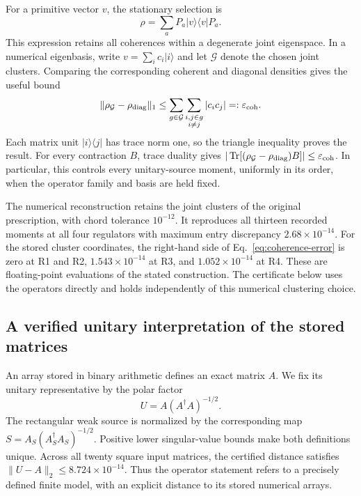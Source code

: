 For a primitive vector $v$, the stationary selection is
\[
\rho=\sum_aP_a|v\rangle\langle v|P_a.
\]
This expression retains all coherences within a degenerate joint eigenspace. In a numerical eigenbasis, write $v=\sum_i c_i|i\rangle$ and let $\mathcal G$ denote the chosen joint clusters. Comparing the corresponding coherent and diagonal densities gives the useful bound
\begin{equation}\label{eq:coherence-error}
\|\rho_{\mathcal G}-\rho_{\rm diag}\|_1
\leq\sum_{g\in\mathcal G}\sum_{\substack{i,j\in g\\i\ne j}}|c_i c_j|
=:\varepsilon_{\rm coh}.
\end{equation}
Each matrix unit $|i\rangle\langle j|$ has trace norm one, so the triangle inequality proves the result. For every contraction $B$, trace duality gives
$|\operatorname{Tr}[(\rho_{\mathcal G}-\rho_{\rm diag})B]|\leq\varepsilon_{\rm coh}$. In particular, this controls every unitary-source moment, uniformly in its order, when the operator family and basis are held fixed.

The numerical reconstruction retains the joint clusters of the original prescription, with chord tolerance $10^{-12}$. It reproduces all thirteen recorded moments at all four regulators with maximum entry discrepancy $2.68\times10^{-14}$. For the stored cluster coordinates, the right-hand side of Eq.~\eqref{eq:coherence-error} is zero at R1 and R2, $1.543\times10^{-14}$ at R3, and $1.052\times10^{-14}$ at R4. These are floating-point evaluations of the stated construction. The certificate below uses the operators directly and holds independently of this numerical clustering choice.

\subsection{A verified unitary interpretation of the stored matrices}
\label{sec:operator-disks}
An array stored in binary arithmetic defines an exact matrix $A$. We fix its unitary representative by the polar factor \cite{Higham86}
\begin{equation}\label{eq:polar-model}
U=A(A^\dagger A)^{-1/2}.
\end{equation}
The rectangular weak source is normalized by the corresponding map $S=A_S(A_S^\dagger A_S)^{-1/2}$. Positive lower singular-value bounds make both definitions unique. Across all twenty square input matrices, the certified distance satisfies $\|U-A\|_2\leq8.724\times10^{-14}$. Thus the operator statement refers to a precisely defined finite model, with an explicit distance to its stored numerical arrays.

